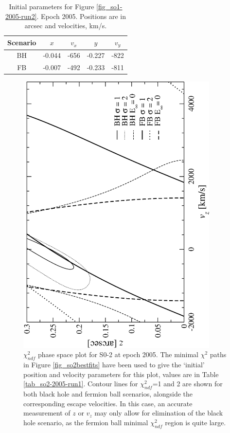 \begin{table}[!p]
	\begin{center}
	\begin{tabular}{c c c c c}
	\hline
	\hline
	Scenario & $x$ & $v_x$ & $y$ & $v_y$\\
	\hline
	BH &  -0.044 & -656  & -0.227 & -822 \\
	FB &  -0.007 & -492  & -0.233 & -811 \\
	\hline
	\end{tabular}
	\end{center}
	\caption{Initial parameters for Figure \ref{fig_so1-2005-run2}. Epoch 2005. Positions are in arcsec and velocities, km/s.}
	\label{tab_so1-2005-run2}
\end{table}
\clearpage
\begin{figure}[!p]
	\begin{center}
	\includegraphics[angle=-90,width=0.9\textwidth]{eps/phasespace-2005-run1-so2.eps}
	\caption{$\chi^2_{ndf}$ phase space plot for S0-2 at epoch 2005. The minimal $\chi^2$ paths in Figure \ref{fig_so2bestfits}
	have been used to give the `initial' position and velocity parameters for this plot, values are in Table \ref{tab_so2-2005-run1}.
	Contour lines for $\chi^2_{ndf}$=1 and 2 are shown for both black hole and fermion ball scenarios, alongside the corresponding
	escape velocities.
	In this case, an accurate measurement of $z$ or $v_z$ may only allow for elimination of the black hole scenario, as the fermion ball
	minimal $\chi^2_{ndf}$ region is quite large.}
	\label{fig_so2-2005-run1}
	\end{center}
\end{figure}
